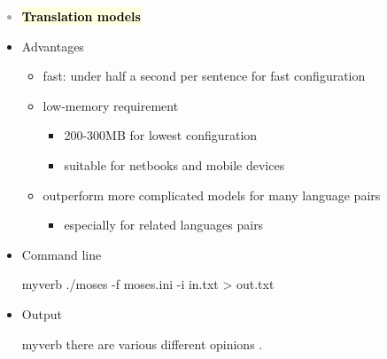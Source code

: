 \documentclass[landscape]{uedslides2C}
\newcommand{\currenttopic}[1]{\colorbox{lightyellow}{\textcolor{black}{\bf #1}}}
\begin{document}

\vspace{-5mm}
\textcolor{darkgrey}{
\begin{itemize} \itemsep -1mm
\item \currenttopic{Translation models}
\end{itemize}
}


\begin{itemize}
\item Advantages
\vspace{-1mm}
\begin{itemize}
\item fast: under half a second per sentence for fast configuration
\item low-memory requirement
	\begin{itemize}
	\item 200-300MB for lowest configuration
	\item suitable for netbooks and mobile devices
	\end{itemize}
\item outperform more complicated models for many language pairs
	\begin{itemize}
	\item especially for related languages pairs
	\end{itemize}
\end{itemize}
\item Command line   
\vspace{-4mm}
\begin{center}
\begin{SaveVerbatim}{myverb}
 ./moses -f moses.ini -i in.txt > out.txt
\end{SaveVerbatim}
\colorbox{gray}{}
\end{center}
\item Output
\vspace{-4mm}
\begin{center}
\begin{SaveVerbatim}{myverb}
there are various different opinions .
\end{SaveVerbatim}
\colorbox{gray}{}
\end{center}
\end{itemize}
\end{document}
